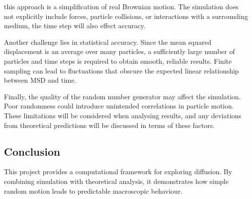\documentclass[12pt]{article}
\begin{document}
this approach is a simplification of real Brownian motion. The simulation does not explicitly include forces, particle collisions, or interactions with a surrounding medium, the time step will also effect accuracy.

Another challenge lies in statistical accuracy. Since the mean squared displacement is an average over many particles, a sufficiently large number of particles and time steps is required to obtain smooth, reliable results. Finite sampling can lead to fluctuations that obscure the expected linear relationship between MSD and time.

Finally, the quality of the random number generator may affect the simulation. Poor randomness could introduce unintended correlations in particle motion. These limitations will be considered when analysing results, and any deviations from theoretical predictions will be discussed in terms of these factors.
\subsection{Conclusion}
This project provides a computational framework for exploring diffusion. By combining simulation with theoretical analysis, it demonstrates how simple random motion leads to predictable macroscopic behaviour.
\end{document}
